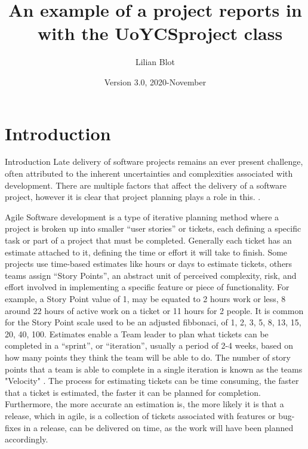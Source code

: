 \documentclass{UoYCSproject}
\author{Lilian Blot}
\title{An example of a project reports in \LaTeXe\ with the   \textsf{UoYCSproject} class}
\date{Version 3.0, 2020-November}
\begin{document}
\maketitle
\listoffigures
\listoftables



    \chapter{Introduction}
    \label{ch:introduction}
    \setcounter{page}{1}

    Introduction
    Late delivery of software projects remains an ever present challenge, often attributed to the inherent uncertainties and complexities associated with development.
    There are multiple factors that affect the delivery of a software project, however it is clear that project planning plays a role in this. \cite{CHOW2008961}. \par
    Agile Software development is a type of iterative planning method where a project is broken up into smaller “user stories” or tickets, each defining a specific task or part of a project that must be completed.
    Generally each ticket has an estimate attached to it, defining the time or effort it will take to finish.
    Some projects use time-based estimates like hours or days to estimate tickets, others teams assign “Story Points”, an abstract unit of perceived complexity, risk, and effort involved in implementing a specific feature or piece of functionality.
    For example, a Story Point value of 1, may be equated to 2 hours work or less, 8 around 22 hours of active work on a ticket or 11 hours for 2 people.
    It is common for the Story Point scale used to be an adjusted fibbonaci, of 1, 2, 3, 5, 8, 13, 15, 20, 40, 100.
    Estimates enable a Team leader to plan what tickets can be completed in a “sprint”, or “iteration”, usually a period of 2-4 weeks, based on how many points they think the team will be able to do.
    The number of story points that a team is able to complete in a single iteration is known as the teams "Velocity" \cite{cohn2005agile}.
    The process for estimating tickets can be time consuming, the faster that a ticket is estimated, the faster it can be planned for completion.
    Furthermore, the more accurate an estimation is, the more likely it is that a release, which in agile, is a collection of tickets associated with features or bug-fixes in a release, can be delivered on time, as the work will have been planned accordingly. \par
\end{document}
